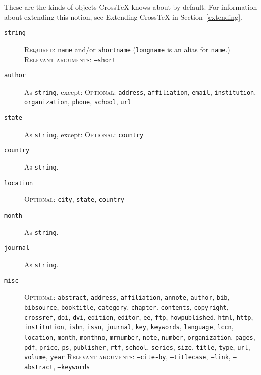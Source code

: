 \documentclass{article}
\newcommand{\XTeX}{Cross\TeX}
\begin{document}
These are the kinds of objects \XTeX{} knows about by default. For information about extending this notion, see Extending \XTeX{} in Section~\ref{extending}.

\begin{description}

\item[\texttt{string}]
\textsc{Required:} \texttt{name} and/or \texttt{shortname} (\texttt{longname} is an alias for \texttt{name}.)
\textsc{Relevant arguments:} \texttt{--short}

\item[\texttt{author}] As \texttt{string}, except:
\textsc{Optional:} \texttt{address}, \texttt{affiliation}, \texttt{email}, \texttt{institution}, \texttt{organization}, \texttt{phone}, \texttt{school}, \texttt{url}

\item[\texttt{state}] As \texttt{string}, except:
\textsc{Optional:} \texttt{country}

\item[\texttt{country}] As \texttt{string}.

\item[\texttt{location}]
\textsc{Optional:} \texttt{city}, \texttt{state}, \texttt{country}

\item[\texttt{month}] As \texttt{string}.

\item[\texttt{journal}] As \texttt{string}.

\item[\texttt{misc}]
\textsc{Optional:}
\texttt{abstract},
\texttt{address},
\texttt{affiliation},
\texttt{annote},
\texttt{author},
\texttt{bib},
\texttt{bibsource},
\texttt{booktitle},
\texttt{category},
\texttt{chapter},
\texttt{contents},
\texttt{copyright},
\texttt{crossref},
\texttt{doi},
\texttt{dvi},
\texttt{edition},
\texttt{editor},
\texttt{ee},
\texttt{ftp},
\texttt{howpublished},
\texttt{html},
\texttt{http},
\texttt{institution},
\texttt{isbn},
\texttt{issn},
\texttt{journal},
\texttt{key},
\texttt{keywords},
\texttt{language},
\texttt{lccn},
\texttt{location},
\texttt{month},
\texttt{monthno},
\texttt{mrnumber},
\texttt{note},
\texttt{number},
\texttt{organization},
\texttt{pages},
\texttt{pdf},
\texttt{price},
\texttt{ps},
\texttt{publisher},
\texttt{rtf},
\texttt{school},
\texttt{series},
\texttt{size},
\texttt{title},
\texttt{type},
\texttt{url},
\texttt{volume},
\texttt{year}
\textsc{Relevant arguments:} \texttt{--cite-by}, \texttt{--titlecase}, \texttt{--link}, \texttt{--abstract}, \texttt{--keywords}


\end{description}
\end{document}
